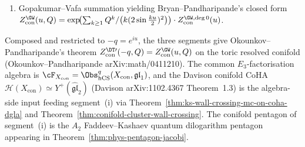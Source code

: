 \begin{proposition}
\begin{enumerate}[label=\textup{(\roman*)}]
\item Gopakumar--Vafa summation yielding Bryan--Pandharipande's
 closed form
 $Z^{\GW}_{\mathrm{con}}(u, Q) = \exp\!\bigl(
 \sum_{k\geq 1} Q^{k} / \bigl(k(2\sin\tfrac{ku}{2})^{2}\bigr)\bigr)
 \cdot Z^{\GW,\mathrm{deg\,0}}_{\mathrm{con}}(u)$.
\end{enumerate}
Composed and restricted to $-q = e^{iu}$, the three segments give
Okounkov--Pandharipande's theorem $Z^{\DT\prime}_{\mathrm{con}}(-q, Q)
 = Z^{\GW}_{\mathrm{con}}(u, Q)$ on the toric resolved conifold
(Okounkov--Pandharipande \textup{arXiv:math/0411210}). The common
$E_3$-factorisation algebra is
$\cF_{X_{\mathrm{con}}} = \Obs^{q}_{\hCS}(X_{\mathrm{con}}, \mathfrak{gl}_{1})$,
and the Davison conifold CoHA
$\mathcal{H}(X_{\mathrm{con}}) \simeq Y^{+}(\widehat{\mathfrak{gl}}_{2})$
(Davison \textup{arXiv:1102.4367} Theorem~1.3) is the algebra-side
input feeding segment~(i) via
Theorem~\ref{thm:ks-wall-crossing-mc-on-coha-dgla} and
Theorem~\ref{thm:conifold-cluster-wall-crossing}. The conifold
pentagon of segment~(i) is the $A_{2}$ Faddeev--Kashaev quantum
dilogarithm pentagon appearing in
Theorem~\ref{thm:phys-pentagon-jacobi}.
\end{proposition}

